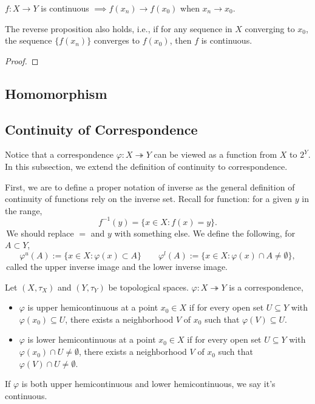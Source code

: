 \begin{theorem}
    $f:X\to Y$ is continuous $\implies f(x_n) \to f(x_0)$ when $x_n \to x_0$.     
\end{theorem}
\begin{remark}
    The reverse proposition also holds, i.e., if for any sequence in $X$ converging to $x_0$, the sequence $\{f(x_n)\}$ converges to $f(x_0)$, then $f$ is continuous.
\end{remark}
\begin{proof}
    
\end{proof}

\subsection{Homomorphism}

\subsection{Continuity of Correspondence}
Notice that a correspondence $\varphi : X\twoheadrightarrow Y$ can be viewed as a function from $X$ to $2^Y$. In this subsection, we extend the definition of continuity to correspondence.

First, we are to define a proper notation of inverse as the general definition of continuity of functions rely on the inverse set. Recall for function: for a given $y$ in the range,
$$f^{-1}(y) = \{x\in X: f(x) = y\}.$$
\,We should replace $=$ and $y$ with something else. We define the following, for $A\subset Y$, $$\varphi^{u} (A):=\{x\in X: \varphi(x) \subset A\} \qquad \varphi^{l} (A):=\{x\in X: \varphi(x) \cap A \neq \emptyset\},$$
\,called the upper inverse image and the lower inverse image.

\begin{definition}
    Let $(X,\tau_X)$ and $(Y,\tau_Y)$ be topological spaces. $\varphi: X\twoheadrightarrow Y$ is a correspondence,
    \begin{itemize}
        \item $\varphi$ is upper hemicontinuous at a point $x_0 \in X$ if for every open set $U \subseteq Y$ with $\varphi(x_0) \subseteq U$, there exists a neighborhood $V$ of $x_0$ such that $\varphi(V) \subseteq U$.
        \item $\varphi$ is lower hemicontinuous at a point $x_0 \in X$ if for every open set $U \subseteq Y$ with $\varphi(x_0) \cap U \neq \emptyset$, there exists a neighborhood $V$ of $x_0$ such that $\varphi(V) \cap U \neq \emptyset$.
    \end{itemize}
If $\varphi$ is both upper hemicontinuous and lower hemicontinuous, we say it's continuous.
\end{definition}

